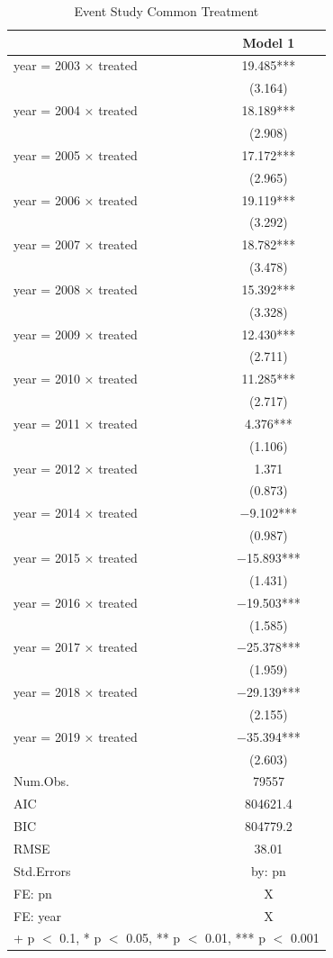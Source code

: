 \documentclass[
]{article}
\begin{document}
\begin{table}

\caption{\label{tab:table-4}Event Study Common Treatment}
\centering
\begin{tabular}[t]{lc}
\toprule
  & Model 1\\
\midrule
year = 2003 × treated & \num{19.485}***\\
 & (\num{3.164})\\
year = 2004 × treated & \num{18.189}***\\
 & (\num{2.908})\\
year = 2005 × treated & \num{17.172}***\\
 & (\num{2.965})\\
year = 2006 × treated & \num{19.119}***\\
 & (\num{3.292})\\
year = 2007 × treated & \num{18.782}***\\
 & (\num{3.478})\\
year = 2008 × treated & \num{15.392}***\\
 & (\num{3.328})\\
year = 2009 × treated & \num{12.430}***\\
 & (\num{2.711})\\
year = 2010 × treated & \num{11.285}***\\
 & (\num{2.717})\\
year = 2011 × treated & \num{4.376}***\\
 & (\num{1.106})\\
year = 2012 × treated & \num{1.371}\\
 & (\num{0.873})\\
year = 2014 × treated & \num{-9.102}***\\
 & (\num{0.987})\\
year = 2015 × treated & \num{-15.893}***\\
 & (\num{1.431})\\
year = 2016 × treated & \num{-19.503}***\\
 & (\num{1.585})\\
year = 2017 × treated & \num{-25.378}***\\
 & (\num{1.959})\\
year = 2018 × treated & \num{-29.139}***\\
 & (\num{2.155})\\
year = 2019 × treated & \num{-35.394}***\\
 & (\num{2.603})\\
\midrule
Num.Obs. & \num{79557}\\
AIC & \num{804621.4}\\
BIC & \num{804779.2}\\
RMSE & \num{38.01}\\
Std.Errors & by: pn\\
FE: pn & X\\
FE: year & X\\
\bottomrule
\multicolumn{2}{l}{\rule{0pt}{1em}+ p $<$ 0.1, * p $<$ 0.05, ** p $<$ 0.01, *** p $<$ 0.001}\\
\end{tabular}
\end{table}
\end{document}
